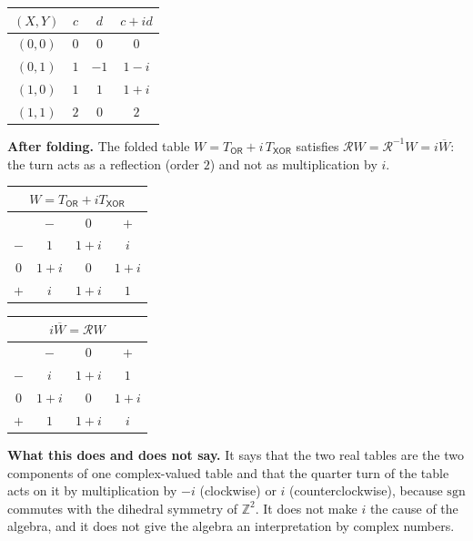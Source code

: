 \documentclass[10pt,a4paper]{article}
\begin{document}
\begin{center}\small\begin{tabular}{cccc}\toprule $(X,Y)$&$c$&$d$&$c+id$\\\midrule
$(0,0)$&$0$&$0$&$0$\\ $(0,1)$&$1$&$-1$&$1- i$\\ $(1,0)$&$1$&$1$&$1+ i$\\ $(1,1)$&$2$&$0$&$2$\\
\bottomrule\end{tabular}\end{center}
\textbf{After folding.} The folded table $W=T_{\mathsf{OR}}+i\,T_{\mathsf{XOR}}$ satisfies $\mathcal RW=\mathcal R^{-1}W=i\overline W$: the turn acts as a reflection (order $2$) and not as multiplication by $i$.
\begin{center}\small \begin{minipage}[t]{3.6cm}\centering \begin{tabular}{c|ccc}\multicolumn{4}{c}{$W=T_{\mathsf{OR}}+iT_{\mathsf{XOR}}$}\\\hline &$-$&$0$&$+$\\\hline $-$&$1$&$1+ i$&$i$\\$0$&$1+ i$&$0$&$1+ i$\\$+$&$i$&$1+ i$&$1$\\\end{tabular}\end{minipage}\quad \begin{minipage}[t]{3.6cm}\centering \begin{tabular}{c|ccc}\multicolumn{4}{c}{$i\overline W=\mathcal R W$}\\\hline &$-$&$0$&$+$\\\hline $-$&$i$&$1+ i$&$1$\\$0$&$1+ i$&$0$&$1+ i$\\$+$&$1$&$1+ i$&$i$\\\end{tabular}\end{minipage}\end{center}
\textbf{What this does and does not say.} It says that the two real tables are the two components of one complex-valued table and that the quarter turn of the table acts on it by multiplication by $-i$ (clockwise) or $i$ (counterclockwise), because $\mathrm{sgn}$ commutes with the dihedral symmetry of $\mathbb Z^2$. It does not make $i$ the cause of the algebra, and it does not give the algebra an interpretation by complex numbers.
\end{document}
